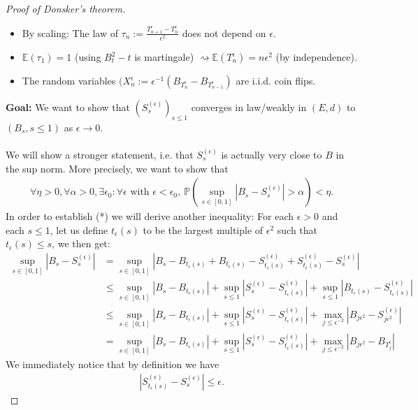 \documentclass[../mainfile.tex]{subfiles}
\begin{document}
\begin{proof}[Proof of Donsker's theorem]
\begin{itemize}
\item By scaling: The law of $\tau_n:=\displaystyle \frac{T_{n+1}^\epsilon-T_n^\epsilon}{\epsilon^2}$ does not depend on $\epsilon$. 
\item $\mathbb{E}(\tau_1)=1$ (using $B_t^2-t$ is martingale) $\rightsquigarrow \mathbb{E}(T_n^\epsilon)=n \epsilon^2$ (by independence).
\item The random variables $(X_n^\epsilon := \epsilon^{-1}(B_{T_n^\epsilon}-B_{T_{n-1}^\epsilon})$ are i.i.d. coin flips. 
\end{itemize}
\newpage
\textbf{Goal:} We want to show that $(S_s^{(\epsilon)})_{ s \leq 1}$ converges in law/weakly in $(E,d)$ to $(B_s, s \leq 1)$ as $\epsilon \to 0$. \\
\\
We will show a stronger statement,  i.e. that $S_s^{( \epsilon)}$ is actually very close to $B$ in the sup norm. More precisely, we want to show that
\begin{align*}
\forall \eta > 0, \forall \alpha > 0, \exists \epsilon_0 : \forall \epsilon \text{ with } \epsilon < \epsilon_0 , \ \mathbb{P}( \sup_{ s \in [0,1]} |B_s-S_s^{( \epsilon)} | > \alpha) < \eta. \tag{*}
\end{align*}
In order to establish (*) we will derive another inequality: For each $\epsilon >0$ and each $s \leq 1$, let us define $t_\epsilon(s)$ to be the largest multiple of $\epsilon^2$ such that $t_\epsilon(s) \leq s$, we then get:
\begin{align*}
\sup_{ s \in [0,1]} |B_s-S_s^{( \epsilon)}| &=\sup_{s \in [0,1]} |B_s-B_{t_\epsilon(s)} +B_{t_\epsilon(s)} - S_{t_\epsilon(s)}^{(\epsilon)}+S_{t_\epsilon(s)}^{(\epsilon)}-S_s^{(\epsilon)}| \\
& \leq \sup_{s \in [0,1]} |B_s-B_{t_\epsilon(s)}| + \sup_{s \leq 1} | S_s^{ (\epsilon)} -S_{t_\epsilon(s)}^{( \epsilon)}|+ \sup_{s \leq 1}|B_{t_\epsilon(s)}-S_{t_\epsilon(s)}^{( \epsilon)}| \\
& \leq  \sup_{s \in [0,1]} |B_s-B_{t_\epsilon(s)}| + \sup_{s \leq 1} | S_s^{ (\epsilon)} -S_{t_\epsilon(s)}^{( \epsilon)}|+ \max_{j \leq \epsilon^{- 2}} |B_{j \epsilon^2}-S_{j \epsilon^2}^{(\epsilon)}| \\
&=   \sup_{s \in [0,1]} |B_s-B_{t_\epsilon(s)}| + \sup_{s \leq 1} | S_s^{ (\epsilon)} -S_{t_\epsilon(s)}^{( \epsilon)}|+ \max_{j \leq \epsilon^{- 2}} |B_{j \epsilon^2}-B_{T_j^\epsilon}|
\end{align*}
We immediately notice that by definition we have
\begin{align*}
|S_{t_\epsilon(s)}^{( \epsilon)}-S_s^{(\epsilon)}| \leq \epsilon.

\end{align*}
\end{proof}
\end{document}
